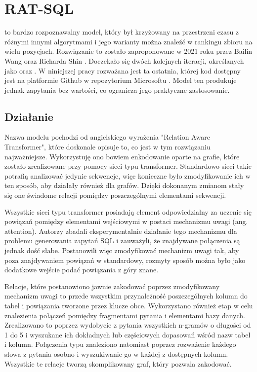 \section{RAT-SQL}
 to bardzo rozpoznawalny model, który był krzyżowany na przestrzeni czasu z różnymi innymi algorytmami i jego warianty można znaleźć w rankingu zbioru  na wielu pozycjach. Rozwiązanie to zostało zaproponowane w 2021 roku przez Bailin Wang oraz Richarda Shin \cite{Wang2019}. Doczekało się dwóch kolejnych iteracji, określanych jako  oraz . W niniejszej pracy rozważana jest ta ostatnia, której kod dostępny jest na platformie Github w repozytorium Microsoftu \cite{ratsql-repository}. Model ten produkuje jednak zapytania bez wartości, co ogranicza jego praktyczne zastosowanie.

\subsection{Działanie}
Nazwa modelu  pochodzi od angielskiego wyrażenia "Relation Aware Transformer", które doskonale opisuje to, co jest w tym rozwiązaniu najważniejsze. Wykorzystuję ono bowiem enkodowanie oparte na grafie, które zostało zrealizowane przy pomocy sieci typu transformer. Standardowo sieci takie potrafią analizować jedynie sekwencje, więc konieczne było zmodyfikowanie ich w ten sposób, aby działały również dla grafów. Dzięki dokonanym zmianom stały się one świadome relacji pomiędzy poszczególnymi elementami sekwencji.

Wszystkie sieci typu transformer posiadają element odpowiedzialny za uczenie się powiązań pomiędzy elementami wejściowymi w postaci mechanizmu uwagi (ang. attention). Autorzy  zbadali eksperymentalnie działanie tego mechanizmu dla problemu generowania zapytań SQL i zauważyli, że znajdywane połączenia są jednak dość słabe. Postanowili więc zmodyfikować mechanizm uwagi tak, aby poza znajdywaniem powiązań w standardowy, rozmyty sposób można było jako dodatkowe wejście podać powiązania z góry znane. 

Relacje, które postanowiono jawnie zakodować poprzez zmodyfikowany mechanizm uwagi to przede wszystkim przynależność poszczególnych kolumn do tabel i powiązania tworzone przez klucze obce. Wykorzystano również etap  w celu znalezienia połączeń pomiędzy fragmentami pytania i elementami bazy danych. Zrealizowano to poprzez wydobycie z pytania wszystkich n-gramów o długości od 1 do 5 i wyszukane ich dokładnych lub częściowych dopasowań wśród nazw tabel i kolumn. Połączenia typu  znaleziono natomiast poprzez rozważenie każdego słowa z pytania osobno i wyszukiwanie go w każdej z dostępnych kolumn. Wszystkie te relacje tworzą skomplikowany graf, który  pozwala zakodować.

